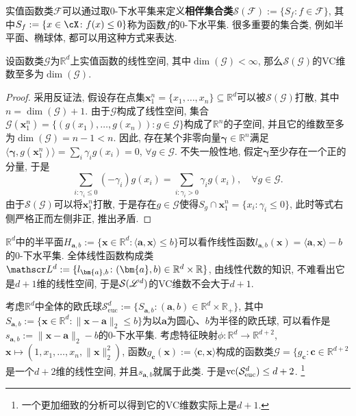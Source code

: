 实值函数类$\mathscr{F}$可以通过取$0$-下水平集来定义\textbf{相伴集合类}$\mathcal{S}(\mathscr{F}):=\{S_f \colon f \in \mathscr{F}\}$, 其中$S_f := \{x \in \cX \colon f(x) \leq 0\}$称为函数$f$的$0$-下水平集. 
很多重要的集合类, 例如半平面、椭球体, 都可以用这种方式来表达. 

\begin{proposition}
	设函数类$\mathscr{G}$为$\mathbb{R}^d$上实值函数的线性空间, 其中$\dim(\mathscr{G}) < \infty$, 那么$\mathcal{S}(\mathscr{G})$的VC维数至多为$\dim(\mathscr{G})$. 	
\end{proposition}
\begin{proof}
	采用反证法, 假设存在点集$\bm{x}_1^n = \{x_1, \dots, x_n\} \subseteq \mathbb{R}^d$可以被$\mathcal{S}(\mathscr{G})$打散, 其中$n = \dim(\mathscr{G}) + 1$.
	由于$\mathscr{G}$构成了线性空间, 集合$\mathscr{G}(\bm{x}_1^n) = \{(g(x_1), \dots, g(x_n)) \colon g \in \mathscr{G}\}$构成了$\mathbb{R}^n$的子空间, 并且它的维数至多为$\dim(\mathscr{G}) = n-1 < n$. 
	因此, 存在某个非零向量$\bm\gamma \in \mathbb{R}^n$满足$\langle \bm{\gamma}, g(\bm{x}_1^n) \rangle = \sum_i \gamma_i g(x_i) = 0$, $\forall g \in \mathscr{G}$. 
	不失一般性地, 假定$\bm{\gamma}$至少存在一个正的分量, 于是
	\begin{equation*}
		\sum_{i \colon \gamma_i \leq 0} (-\gamma_i) g(x_i)
		= \sum_{i \colon \gamma_i > 0} \gamma_i g(x_i), \quad
		\forall g \in \mathscr{G}. 
	\end{equation*}
	由于$\mathcal{S}(\mathscr{G})$可以将$\bm{x}_1^n$打散, 于是存在$g \in \mathscr{G}$使得$S_g \cap \bm{x}_1^n = \{x_i \colon \gamma_i \leq 0\}$, 此时等式右侧严格正而左侧非正, 推出矛盾. 
\end{proof}

\begin{example}
	$\mathbb{R}^d$中的半平面$H_{\bm{a},b} := \{\bm{x} \in \mathbb{R}^d \colon \langle \bm{a}, \bm{x} \rangle  \leq b\}$可以看作线性函数$l_{\bm{a},b}(\bm{x}) = \langle \bm{a}, \bm{x} \rangle - b$的$0$-下水平集. 
	全体线性函数构成类$\sL^d := \{l_{\bm{a},b} \colon (\bm{a}, b) \in \mathbb{R}^d \times \mathbb{R} \}$, 由线性代数的知识, 不难看出它是$d+1$维的线性空间, 于是$\mathcal{S}(\mathscr{L}^d)$的VC维数不会大于$d+1$. 
\end{example}


\begin{example}
	考虑$\mathbb{R}^d$中全体的欧氏球$\mathcal{S}^d_{\text{euc}} := \{S_{\bm{a},b} \colon (\bm{a},b) \in \mathbb{R}^d \times \mathbb{R}_{+}\}$, 其中$S_{\bm{a},b} := \{\bm{x} \in \mathbb{R}^d \colon \|\bm{x} - \bm{a}\|_2 \leq b\}$为以$\bm{a}$为圆心、$b$为半径的欧氏球, 可以看作是$s_{\bm{a},b} := \|\bm{x} - \bm{a}\|_2 - b$的$0$-下水平集. 
	考虑特征映射$\phi \colon \mathbb{R}^d \to \mathbb{R}^{d+2}$, $\bm{x} \mapsto \left(1, x_1, \dots, x_n, \|\bm{x}\|_2^2 \right)$, 函数$g_{\bm{c}}(\bm{x}) := \langle\bm{c}, \bm{x}\rangle$构成的函数类$\mathscr{G} = \{g_{\bm{c}} \colon \bm{c} \in \mathbb{R}^{d+2}$是一个$d+2$维的线性空间, 并且$s_{\bm{a},b}$就属于此类. 
	于是$\mathrm{vc}(\mathcal{S}^d_{\text{euc}}) \leq d+2$. \footnote{一个更加细致的分析可以得到它的VC维数实际上是$d+1$.}
\end{example}


